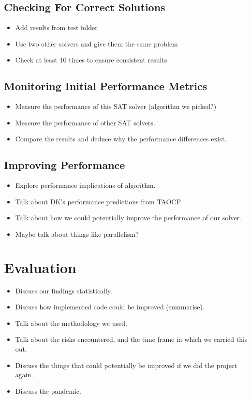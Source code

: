 \documentclass{article}
\begin{document}
\subsection{Checking For Correct Solutions}
\begin{itemize}
    \item Add results from test folder
    \item Use two other solvers and give them the same problem
    \item Check at least 10 times to ensure consistent results
\end{itemize}

\subsection{Monitoring Initial Performance Metrics}
\begin{itemize}
    \item Measure the performance of this SAT solver (algorithm we picked?)
    \item Measure the performance of other SAT solvers.
    \item Compare the results and deduce why the performance differences exist.
\end{itemize}

\subsection{Improving Performance}
\begin{itemize}
    \item Explore performance implications of algorithm.
    \item Talk about DK's performance predictions from TAOCP.
    \item Talk about how we could potentially improve the performance of our solver.
    \item Maybe talk about things like parallelism?
\end{itemize}

\section{Evaluation}
\begin{itemize}
    \item Discuss our findings statistically.
    \item Discuss how implemented code could be improved (summarise).
    \item Talk about the methodology we used.
    \item Talk about the risks encountered, and the time frame in which we carried this out.
    \item Discuss the things that could potentially be improved if we did the project again.
    \item Discuss the pandemic.
\end{itemize}
\end{document}
